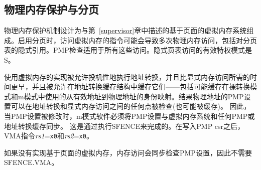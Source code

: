 \subsection{物理内存保护与分页}
\label{pmp-vmem}

\iffalse
The Physical Memory Protection mechanism is designed to compose with the
page-based virtual memory systems described in Chapter~\ref{supervisor}.  When
paging is enabled, instructions that access virtual memory may result in
multiple physical-memory accesses, including implicit references to the page
tables.  The PMP checks apply to all of these accesses.  The effective
privilege mode for implicit page-table accesses is S.
\fi
物理内存保护机制设计为与第~\ref{supervisor}章中描述的基于页面的虚拟内存系统组成。启用分页时，访问虚拟内存的指令可能会导致多次物理内存访问，包括对分页表的隐式引用。PMP检查适用于所有这些访问。隐式页表访问的有效特权模式是S。

\iffalse
Implementations with virtual memory are permitted to perform address
translations speculatively and earlier than required by an explicit memory
access, and are permitted to cache them in address translation cache
structures---including possibly caching the identity mappings from effective
address to physical address used in Bare translation modes and M-mode.  The
PMP settings for the resulting physical address may be checked (and possibly
cached) at any point between the address translation and the explicit memory
access.
Hence, when the PMP settings are modified, M-mode software must
synchronize the PMP settings with the virtual memory system and
any PMP or address-translation caches.
This is
accomplished by executing an SFENCE.VMA instruction with {\em rs1}={\tt x0}
and {\em rs2}={\tt x0}, after the PMP CSRs are written.
\fi
使用虚拟内存的实现被允许投机性地执行地址转换，并且比显式内存访问所需的时间更早，并且被允许在地址转换缓存结构中缓存它们——包括可能缓存在裸转换模式和m模式中使用的从有效地址到物理地址的身份映射。结果物理地址的PMP设置可以在地址转换和显式内存访问之间的任何点被检查(也可能被缓存)。
因此，当PMP设置被修改时，m模式软件必须将PMP设置与虚拟内存系统和任何PMP或地址转换缓存同步。
这是通过执行SFENCE来完成的。在写入PMP csr之后，VMA指令{\em rs1}={\tt x0}和{\em rs2}={\tt x0}。

\iffalse
If page-based virtual memory is not implemented,
memory accesses check the PMP settings synchronously, so no SFENCE.VMA is needed.
\fi
如果没有实现基于页面的虚拟内存，内存访问会同步检查PMP设置，因此不需要SFENCE.VMA。
